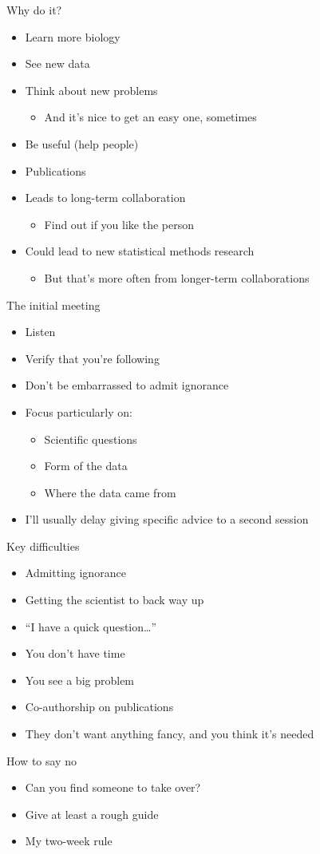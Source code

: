 \documentclass[12pt,t]{beamer}
\newcommand{\bbi}{\vspace{24pt} \begin{itemize} \itemsep12pt}
\newcommand{\bi}{\begin{itemize}}
\newcommand{\ei}{\end{itemize}}
\begin{document}
\begin{frame}{Why do it?}

\bbi
\item Learn more biology
\item See new data
\item Think about new problems
\bi
\item And it's nice to get an easy one, sometimes
\ei
\item Be useful (help people)
\item Publications
\item Leads to long-term collaboration
\bi
\item Find out if you like the person
\ei
\item Could lead to new statistical methods research
\bi
\item But that's more often from longer-term collaborations
\ei
\ei
\end{frame}


\begin{frame}{The initial meeting}

\bbi
\item Listen
\item Verify that you're following
\item Don't be embarrassed to admit ignorance
\item Focus particularly on:
\bi
\item Scientific questions
\item Form of the data
\item Where the data came from
\ei
\item I'll usually delay giving specific advice to a second session
\ei
\end{frame}


\begin{frame}{Key difficulties}

\bbi
\item Admitting ignorance
\item Getting the scientist to back way up
\item ``I have a quick question\dots''
\item You don't have time
\item You see a big problem
\item Co-authorship on publications
\item They don't want anything fancy, and you think it's needed
\ei
\end{frame}

\begin{frame}{How to say no}

\bbi
\item Can you find someone to take over?
\item Give at least a rough guide
\item My two-week rule
\ei
\end{frame}
\end{document}
